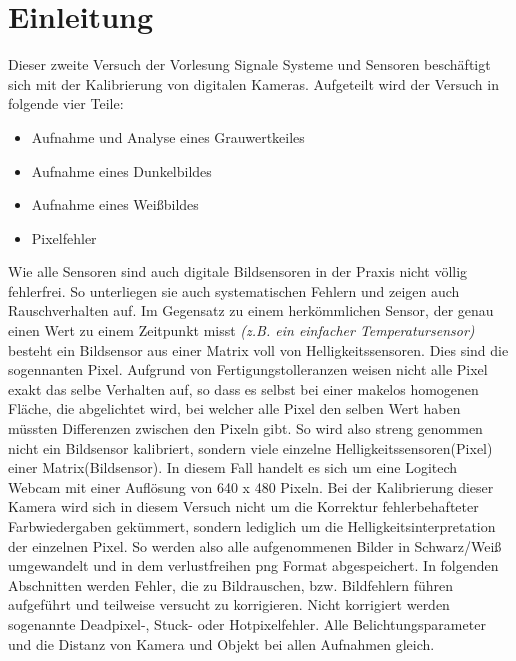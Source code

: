 \documentclass[12pt,oneside,a4paper]{report}
\begin{document}




\clearpage

%
%


%
%


%
%


%
%




\setcounter{page}{1}
%
%
\chapter{Einleitung}
\label{chap:EINL}
Dieser zweite Versuch der Vorlesung Signale Systeme und Sensoren beschäftigt sich mit der Kalibrierung von digitalen Kameras. Aufgeteilt wird der Versuch in folgende vier Teile:
\begin{itemize}
\setlength\itemsep{0.05em}
\item{Aufnahme und Analyse eines Grauwertkeiles}
\item{Aufnahme eines Dunkelbildes}
\item{Aufnahme eines Weißbildes}
\item{Pixelfehler}
\end{itemize}
Wie alle Sensoren sind auch digitale Bildsensoren in der Praxis nicht völlig fehlerfrei. So unterliegen sie auch systematischen Fehlern und zeigen auch Rauschverhalten auf. Im Gegensatz zu einem herkömmlichen Sensor, der genau einen Wert zu einem Zeitpunkt misst \textit{(z.B. ein einfacher Temperatursensor)} besteht ein Bildsensor aus einer Matrix voll von Helligkeitssensoren. Dies sind die sogennanten Pixel. Aufgrund von Fertigungstolleranzen weisen nicht alle Pixel exakt das selbe Verhalten auf, so dass es selbst bei einer makelos homogenen Fläche, die abgelichtet wird, bei welcher alle Pixel den selben Wert haben müssten Differenzen zwischen den Pixeln gibt. So wird also streng genommen nicht ein Bildsensor kalibriert, sondern viele einzelne Helligkeitssensoren(Pixel) einer Matrix(Bildsensor). In diesem Fall handelt es sich um eine Logitech Webcam mit einer Auflösung von 640 x 480 Pixeln. Bei der Kalibrierung dieser Kamera wird sich in diesem Versuch nicht um die Korrektur fehlerbehafteter Farbwiedergaben gekümmert, sondern lediglich um die Helligkeitsinterpretation der einzelnen Pixel. So werden also alle aufgenommenen Bilder in Schwarz/Weiß umgewandelt und in dem verlustfreihen png Format abgespeichert. In folgenden Abschnitten werden Fehler, die zu Bildrauschen, bzw. Bildfehlern führen aufgeführt und teilweise versucht zu korrigieren. Nicht korrigiert werden sogenannte Deadpixel-, Stuck- oder Hotpixelfehler. Alle Belichtungsparameter und die Distanz von Kamera und Objekt bei allen Aufnahmen gleich.
\end{document}
